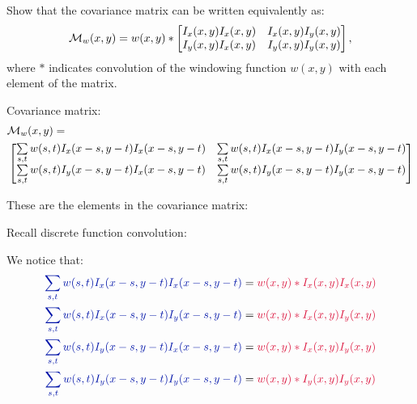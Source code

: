 \begin{problem}
  Show that the covariance matrix can be written equivalently as:
\begin{equation}
  {\mathcal{M}}_w(x,y) = w(x,y)
    \ast
    \begin{bmatrix}
      I_x(x,y)I_x(x,y) & I_x(x,y)I_y(x,y)\\
      I_y(x,y)I_x(x,y) & I_y(x,y)I_y(x,y)
    \end{bmatrix},
\end{equation}
where $\ast$ indicates convolution of the windowing function $w(x,y)$ with each element of the matrix.
\end{problem}

\begin{Answer}
  Covariance matrix:
  \begin{align}
    &\mathcal{M}_w(x,y)=\nonumber \\
    &\begin{bmatrix}
      \sum\limits_{s,t} w(s,t)I_x(x-s,y-t)I_x(x-s,y-t)
      & \sum\limits_{s,t} w(s,t)I_x(x-s,y-t)I_y(x-s,y-t)\\
      \sum\limits_{s,t} w(s,t)I_y(x-s,y-t)I_x(x-s,y-t) &
      \sum\limits_{s,t} w(s,t)I_y(x-s,y-t)I_y(x-s,y-t)
    \end{bmatrix}
  \end{align}

  \step
  These are the elements in the covariance matrix:

  \step
  Recall discrete function convolution:

  \step
  We notice that:
  \begin{align*}
    \zaff{\sum\limits_{s,t} w(s,t)I_x(x-s,y-t)I_x(x-s,y-t)} &= \crim{w(x,y) \ast I_x(x,y)I_x(x,y)}\\
    \zaff{\sum\limits_{s,t} w(s,t)I_x(x-s,y-t)I_y(x-s,y-t)} &= \crim{w(x,y) \ast I_x(x,y)I_y(x,y)}\\
    \zaff{\sum\limits_{s,t} w(s,t)I_y(x-s,y-t)I_x(x-s,y-t)} &= \crim{w(x,y) \ast I_x(x,y)I_y(x,y)}\\
    \zaff{\sum\limits_{s,t} w(s,t)I_y(x-s,y-t)I_y(x-s,y-t)} &= \crim{w(x,y) \ast I_y(x,y)I_y(x,y)}
  \end{align*}


\end{Answer}

